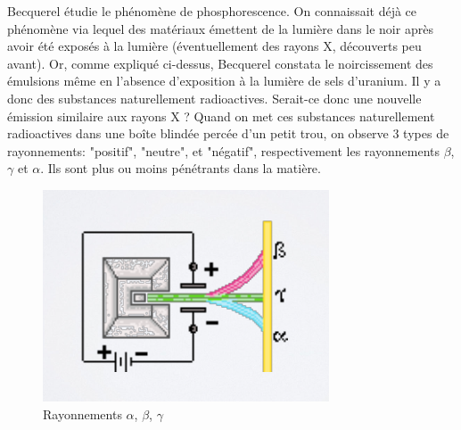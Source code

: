     Becquerel étudie le phénomène de phosphorescence. On connaissait déjà ce phénomène via lequel des matériaux émettent de la lumière dans le noir après avoir été exposés à la lumière (éventuellement des rayons X, découverts peu avant). Or, comme expliqué ci-dessus, Becquerel constata le noircissement des émulsions même en l'absence d'exposition à la lumière de sels d'uranium. Il y a donc des substances naturellement radioactives. Serait-ce donc une nouvelle émission similaire aux rayons X ? Quand on met ces substances naturellement radioactives dans une boîte blindée percée d'un petit trou, on observe 3 types de rayonnements: "positif", "neutre", et "négatif", respectivement les rayonnements $\beta$, $\gamma$ et $\alpha$. Ils sont plus ou moins pénétrants dans la matière. 

    \begin{figure}[ht]
        \centering
        \includegraphics[scale=0.60]{Images1/rayonnements.PNG}
        \caption{Rayonnements $\alpha$, $\beta$, $\gamma$}
    \end{figure}
    
